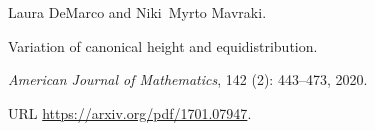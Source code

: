 Laura DeMarco and Niki~Myrto Mavraki.

\newblock Variation of canonical height and equidistribution.

\newblock \emph{American Journal of Mathematics}, 142 (2):
  443--473, 2020.

\newblock URL \url{https://arxiv.org/pdf/1701.07947}.
